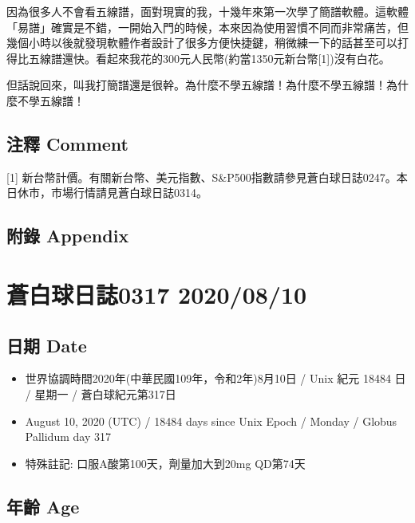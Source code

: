 \documentclass[a5paper, 11pt
]{book}
\providecommand{\tightlist}{%
  \setlength{\itemsep}{0pt}\setlength{\parskip}{0pt}}
\begin{document}
因為很多人不會看五線譜，面對現實的我，十幾年來第一次學了簡譜軟體。這軟體「易譜」確實是不錯，一開始入門的時候，本來因為使用習慣不同而非常痛苦，但幾個小時以後就發現軟體作者設計了很多方便快捷鍵，稍微練一下的話甚至可以打得比五線譜還快。看起來我花的300元人民幣(約當1350元新台幣{[}1{]})沒有白花。

但話說回來，叫我打簡譜還是很幹。為什麼不學五線譜！為什麼不學五線譜！為什麼不學五線譜！

\hypertarget{ux6ce8ux91cb-comment-60}{%
\subsection{注釋 Comment}\label{ux6ce8ux91cb-comment-60}}

{[}1{]}
新台幣計價。有關新台幣、美元指數、S\&P500指數請參見蒼白球日誌0247。本日休市，市場行情請見蒼白球日誌0314。

\hypertarget{ux9644ux9304-appendix-60}{%
\subsection{附錄 Appendix}\label{ux9644ux9304-appendix-60}}

\hypertarget{ux84bcux767dux7403ux65e5ux8a8c0317-20200810}{%
\section{蒼白球日誌0317
2020/08/10}\label{ux84bcux767dux7403ux65e5ux8a8c0317-20200810}}

\hypertarget{ux65e5ux671f-date-61}{%
\subsection{日期 Date}\label{ux65e5ux671f-date-61}}

\begin{itemize}
\tightlist
\item
  世界協調時間2020年(中華民國109年，令和2年)8月10日 / Unix 紀元 18484 日
  / 星期一 / 蒼白球紀元第317日
\item
  August 10, 2020 (UTC) / 18484 days since Unix Epoch / Monday / Globus
  Pallidum day 317
\item
  特殊註記: 口服A酸第100天，劑量加大到20mg QD第74天
\end{itemize}

\hypertarget{ux5e74ux9f61-age-61}{%
\subsection{年齡 Age}\label{ux5e74ux9f61-age-61}}
\end{document}
